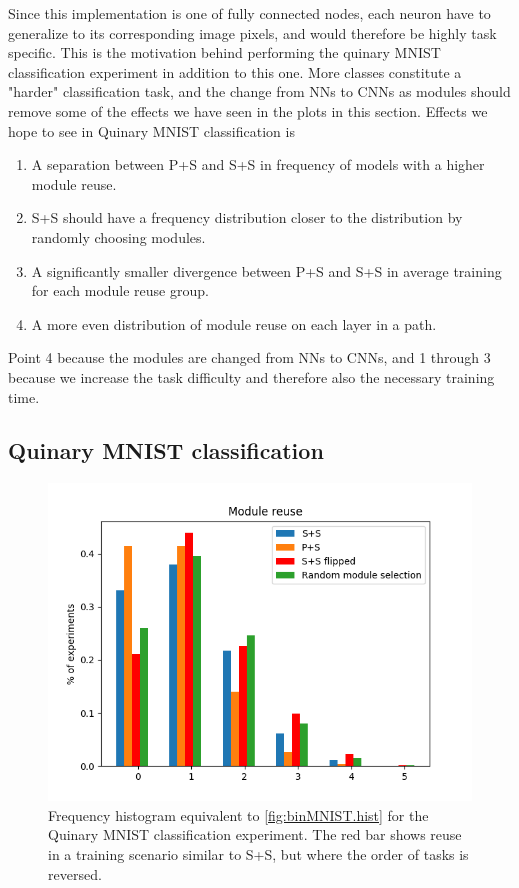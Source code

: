 Since this implementation is one of fully connected nodes, each neuron have to generalize to its corresponding image pixels, and would therefore be highly task specific. This is the motivation behind performing the quinary MNIST classification experiment in addition to this one. More classes constitute a "harder" classification task, and the change from NNs to CNNs as modules should remove some of the effects we have seen in the plots in this section. Effects we hope to see in Quinary MNIST classification is

\begin{enumerate}
    \item A separation between P+S and S+S in frequency of models with a higher module reuse.
    \item S+S should have a frequency distribution closer to the distribution by randomly choosing modules.
    \item A significantly smaller divergence between P+S and S+S in average training for each module reuse group. 
    \item A more even distribution of module reuse on each layer in a path.
\end{enumerate}


Point 4 because the modules are changed from NNs to CNNs, and 1 through 3 because we increase the task difficulty and therefore also the necessary training time. 

\subsection{Quinary MNIST classification}

\begin{figure}[t]
    \includegraphics[width=\textwidth]{Chapters/4.Experiments/exp1/figures/535MNIST_module_reuse.png}
    \caption{Frequency histogram equivalent to \ref{fig:binMNIST.hist} for the Quinary MNIST classification experiment. The red bar shows reuse in a training scenario similar to S+S, but where the order of tasks is reversed.}
    \label{fig:quinMNIST.hist}
\end{figure}

